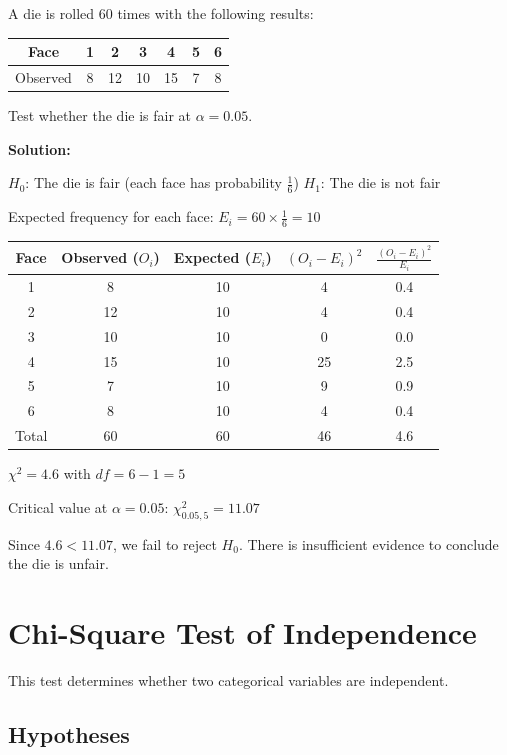 \documentclass[twoside]{book}
\begin{document}
A die is rolled 60 times with the following results:

\begin{center}
\begin{tabular}{|c|c|c|c|c|c|c|}
\hline
Face & 1 & 2 & 3 & 4 & 5 & 6 \\
\hline
Observed & 8 & 12 & 10 & 15 & 7 & 8 \\
\hline
\end{tabular}
\end{center}

Test whether the die is fair at $\alpha = 0.05$.

\textbf{Solution:}

$H_0$: The die is fair (each face has probability $\frac{1}{6}$)
$H_1$: The die is not fair

Expected frequency for each face: $E_i = 60 \times \frac{1}{6} = 10$

\begin{center}
\begin{tabular}{|c|c|c|c|c|}
\hline
Face & Observed ($O_i$) & Expected ($E_i$) & $(O_i - E_i)^2$ & $\frac{(O_i - E_i)^2}{E_i}$ \\
\hline
1 & 8 & 10 & 4 & 0.4 \\
2 & 12 & 10 & 4 & 0.4 \\
3 & 10 & 10 & 0 & 0.0 \\
4 & 15 & 10 & 25 & 2.5 \\
5 & 7 & 10 & 9 & 0.9 \\
6 & 8 & 10 & 4 & 0.4 \\
\hline
Total & 60 & 60 & 46 & 4.6 \\
\hline
\end{tabular}
\end{center}

$\chi^2 = 4.6$ with $df = 6-1 = 5$

Critical value at $\alpha = 0.05$: $\chi^2_{0.05,5} = 11.07$

Since $4.6 < 11.07$, we fail to reject $H_0$. There is insufficient evidence to conclude the die is unfair.

\section{Chi-Square Test of Independence}

This test determines whether two categorical variables are independent.

\subsection{Hypotheses}
\end{document}
